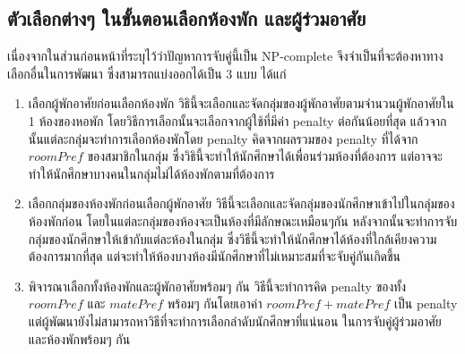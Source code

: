 \subsection{ตัวเลือกต่างๆ ในขั้นตอนเลือกห้องพัก และผู้ร่วมอาศัย}
เนื่องจากในส่วนก่อนหน้าที่ระบุไว้ว่าปัญหาการจับคู่นี้เป็น NP-complete จึงจำเป็นที่จะต้องหาทางเลือกอื่นในการพัฒนา 
ซึ่งสามารถแบ่งออกได้เป็น 3 แบบ ได้แก่
\begin{enumerate}
  \item เลือกผู้พักอาศัยก่อนเลือกห้องพัก
        วิธินี้จะเลือกและจัดกลุ่มของผู้พักอาศัยตามจำนวนผู้พักอาศัยใน 1 ห้องของหอพัก โดยวิธีการเลือกนั้นจะเลือกจากผู้ใช้ที่มีค่า penalty ต่อกันน้อยที่สุด
        แล้วจากนั้นแต่ละกลุ่มจะทำการเลือกห้องพักโดย penalty คิดจากผลรวมของ penalty ที่ได้จาก $\mathit{roomPref}$ ของสมาชิกในกลุ่ม
        ซึ่งวิธินี้จะทำให้นักศึกษาได้เพื่อนร่วมห้องที่ต้องการ แต่อาจจะทำให้นักศึกษาบางคนในกลุ่มไม่ได้ห้องพักตามที่ต้องการ
  \item เลือกกลุ่มของห้องพักก่อนเลือกผู้พักอาศัย
        วิธีนี้จะเลือกและจัดกลุ่มของนักศึกษาเข้าไปในกลุ่มของห้องพักก่อน โดยในแต่ละกลุ่มของห้องจะเป็นห้องที่มีลักษณะเหมือนๆกัน
        หลังจากนั้นจะทำการจับกลุ่มของนักศึกษาให้เข้ากับแต่ละห้องในกลุ่ม ซึ่งวิธีนี้จะทำให้นักศึกษาได้ห้องที่ใกล้เคียงความต้องการมากที่สุด 
        แต่จะทำให้ห้องบางห้องมีนักศึกษาที่ไม่เหมาะสมที่จะจับคู่กันเกิดขึ้น
  \item พิจารณาเลือกทั้งห้องพักและผู้พักอาศัยพร้อมๆ กัน
        วิธีนี้จะทำการคิด penalty ของทั้ง $\mathit{roomPref}$ และ $\mathit{matePref}$ พร้อมๆ กันโดยเอาค่า $\mathit{roomPref} + \mathit{matePref}$ เป็น penalty
        แต่ผู้พัฒนายังไม่สามารถหาวิธีที่จะทำการเลือกลำดับนักศึกษาที่แน่นอน ในการจับคู่ผู้ร่วมอาศัยและห้องพักพร้อมๆ กัน
\end{enumerate}

